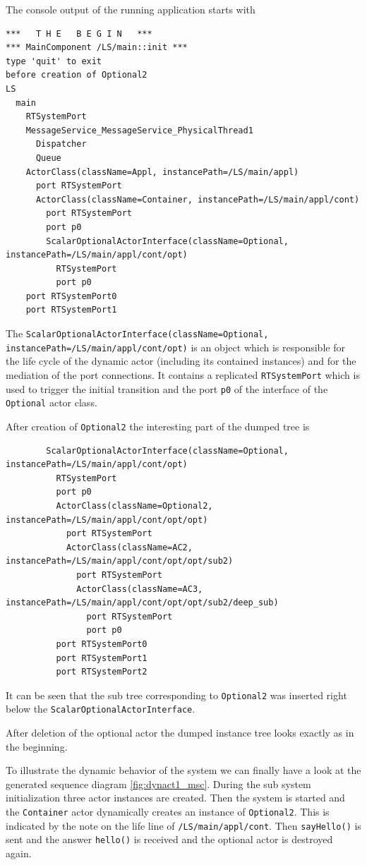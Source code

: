 The console output of the running application starts with

\begin{verbatim}
***   T H E   B E G I N   ***
*** MainComponent /LS/main::init ***
type 'quit' to exit
before creation of Optional2
LS
  main
    RTSystemPort
    MessageService_MessageService_PhysicalThread1
      Dispatcher
      Queue
    ActorClass(className=Appl, instancePath=/LS/main/appl)
      port RTSystemPort
      ActorClass(className=Container, instancePath=/LS/main/appl/cont)
        port RTSystemPort
        port p0
        ScalarOptionalActorInterface(className=Optional, instancePath=/LS/main/appl/cont/opt)
          RTSystemPort
          port p0
    port RTSystemPort0
    port RTSystemPort1
\end{verbatim}

The \texttt{ScalarOptionalActorInterface(className=Optional, instancePath=/LS/main/appl/cont/opt)} is an object which is
responsible for the life cycle of the dynamic actor (including its contained instances) and for the mediation of the
port connections. It contains a replicated \texttt{RTSystemPort} which is used to trigger the initial transition and the
port \texttt{p0} of the interface of the \texttt{Optional} actor class.

After creation of \texttt{Optional2} the interesting part of the dumped tree is

\begin{verbatim}
        ScalarOptionalActorInterface(className=Optional, instancePath=/LS/main/appl/cont/opt)
          RTSystemPort
          port p0
          ActorClass(className=Optional2, instancePath=/LS/main/appl/cont/opt/opt)
            port RTSystemPort
            ActorClass(className=AC2, instancePath=/LS/main/appl/cont/opt/opt/sub2)
              port RTSystemPort
              ActorClass(className=AC3, instancePath=/LS/main/appl/cont/opt/opt/sub2/deep_sub)
                port RTSystemPort
                port p0
          port RTSystemPort0
          port RTSystemPort1
          port RTSystemPort2
\end{verbatim}

It can be seen that the sub tree corresponding to \texttt{Optional2} was inserted right below the
\texttt{ScalarOptionalActorInterface}.

After deletion of the optional actor the dumped instance tree looks exactly as in the beginning.

To illustrate the dynamic behavior of the system we can finally have a look at the generated
sequence diagram \ref{fig:dynact1_msc}. During the sub system initialization three actor
instances are created. Then the system is started and the \texttt{Container} actor dynamically creates
an instance of \texttt{Optional2}. This is indicated by the note on the life line of \texttt{/LS/main/appl/cont}.
Then \texttt{sayHello()} is sent and the answer \texttt{hello()} is received and the optional actor
is destroyed again.

